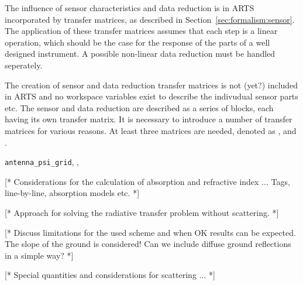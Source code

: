 The influence of sensor characteristics and data reduction is in ARTS
incorporated by transfer matrices, as described in
Section~\ref{sec:formalism:sensor}. The application of these transfer
matrices assumes that each step is a linear operation, which should be
the case for the response of the parts of a well designed instrument.
A possible non-linear data reduction must be handled seperately.

The creation of sensor and data reduction transfer matrices is not
(yet?) included in ARTS and no workspace variables exist to describe
the indivudual sensor parts etc. The sensor and data reduction are
described as a series of blocks, each having its own transfer matrix.
It is necessary to introduce a number of transfer matrices for various
reasons. At least three matrices are needed, denoted as ,
 and .



\label{sec:fm_defs:scandef}


\label{sec:fm_defs:sensorvars}

\verb|antenna_psi_grid|, , 


\label{sec:fm_defs:absorption}

[* Considerations for the calculation of absorption and refractive index ...
Tags, line-by-line, absorption models etc. *]



\label{sec:fm_defs:rte}

[* Approach for solving the radiative transfer problem without scattering. *]


\label{sec:fm_defs:groundrefl}

[* Discuss limitations for the used scheme and when OK results can be
expected. The slope of the ground is considered! Can we include
diffuse ground reflections in a simple way? *]



\label{sec:fm_defs:scattering}

[* Special quantities and considerations for scattering ... *]


